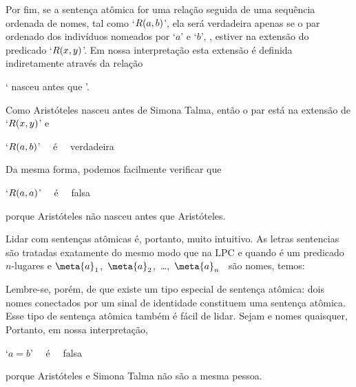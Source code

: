 Por fim, se a sentença atômica for uma relação seguida de uma sequência ordenada de nomes, tal como `$\mathord{R}(a,b)$', ela será verdadeira apenas se o par ordenado dos indivíduos nomeados por `$a$' e `$b$', , estiver na extensão do predicado `$\mathord{R}(x,y)$'.
Em nossa interpretação esta extensão é definida indiretamente através da relação
\begin{center}
	` nasceu antes que '.
\end{center}	
Como Aristóteles nasceu antes de Simona Talma, então o par  está na extensão de `$\mathord{R}(x,y)$' e
\begin{center}
	`$\mathord{R}(a,b)$' \ \ é \ \ verdadeira
\end{center}
Da mesma forma, podemos facilmente verificar que 
\begin{center}
	`$\mathord{R}(a,a)$' \ \ é \ \ falsa
\end{center}
porque Aristóteles não nasceu antes que Aristóteles.

Lidar com sentenças atômicas é, portanto, muito intuitivo.
As letras sentencias são tratadas exatamente do mesmo modo que na LPC e quando  é um predicado $n$-lugares e \mbox{$\meta{a}_1 $, $\meta{a}_{2}$, \dots, $\meta{a}_{n}$} \ são nomes, temos:

Lembre-se, porém, de que existe um tipo especial de sentença atômica: dois nomes conectados por um sinal de identidade constituem uma sentença atômica.
Esse tipo de sentença atômica também é fácil de lidar.
Sejam  e  nomes quaisquer,
Portanto, em nossa interpretação,
\begin{center}
	`$a=b$' \ \ é \ \ falsa
\end{center}
porque Aristóteles e Simona Talma não são a mesma pessoa.


